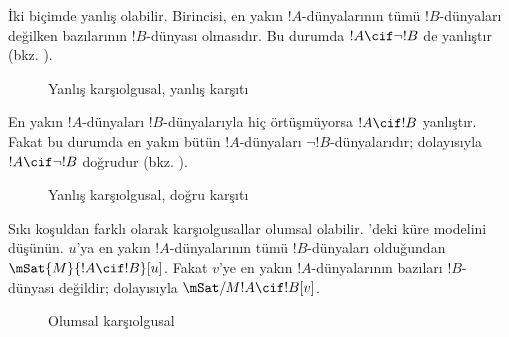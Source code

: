 İki biçimde yanlış olabilir. Birincisi, en yakın $!A$-dünyalarının tümü
$!B$-dünyaları değilken bazılarının $!B$-dünyası olmasıdır. Bu durumda
$!A\cif\lnot !B$ de yanlıştır (bkz. ).
\begin{figure}
\begin{center}
\caption{Yanlış karşıolgusal, yanlış karşıtı}
\end{center}
\end{figure}
En yakın $!A$-dünyaları $!B$-dünyalarıyla hiç örtüşmüyorsa
$!A\cif !B$ yanlıştır. Fakat bu durumda en yakın bütün $!A$-dünyaları
$\lnot !B$-dünyalarıdır; dolayısıyla $!A\cif\lnot !B$ doğrudur
(bkz. ).
\begin{figure}
\begin{center}
\caption{Yanlış karşıolgusal, doğru karşıtı}
\end{center}
\end{figure}

Sıkı koşuldan farklı olarak karşıolgusallar olumsal olabilir.
'deki küre modelini düşünün. $u$'ya en yakın
$!A$-dünyalarının tümü $!B$-dünyaları olduğundan
$\mSat{M}{!A\cif !B}[u]$. Fakat $v$'ye en yakın $!A$-dünyalarının bazıları
$!B$-dünyası değildir; dolayısıyla $\mSat/{M}{!A\cif !B}[v]$.
\begin{figure}
\begin{center}
\end{center}
\caption{Olumsal karşıolgusal}
\end{figure}
